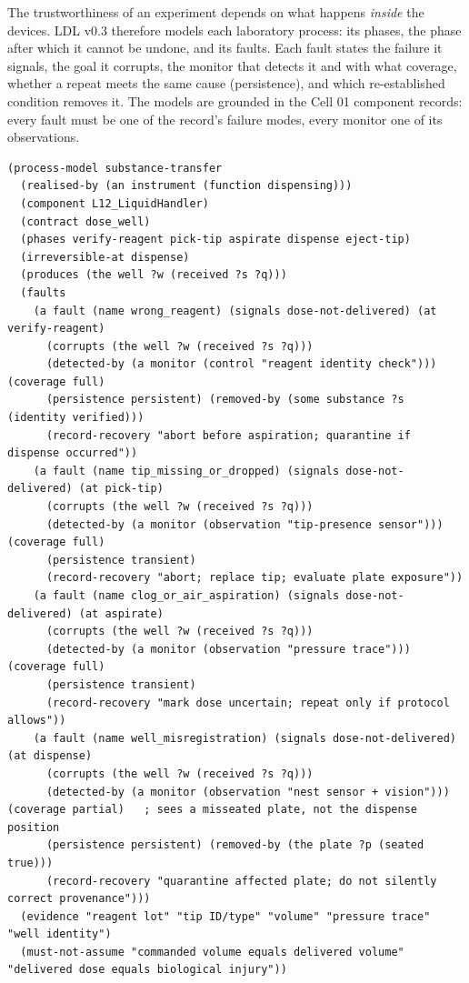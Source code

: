 \documentclass[10pt,a4paper]{article}
\begin{document}
The trustworthiness of an experiment depends on what happens \emph{inside} the devices. LDL v0.3 therefore models each laboratory process: its phases, the phase after which it cannot be undone, and its faults. Each fault states the failure it signals, the goal it corrupts, the monitor that detects it and with what coverage, whether a repeat meets the same cause (persistence), and which re-established condition removes it. The models are grounded in the Cell 01 component records: every fault must be one of the record's failure modes, every monitor one of its observations.

\begin{listing}[tbp]
\begin{Verbatim}[fontsize=\footnotesize,breaklines,frame=lines,framesep=2mm]
(process-model substance-transfer
  (realised-by (an instrument (function dispensing)))
  (component L12_LiquidHandler)
  (contract dose_well)
  (phases verify-reagent pick-tip aspirate dispense eject-tip)
  (irreversible-at dispense)
  (produces (the well ?w (received ?s ?q)))
  (faults
    (a fault (name wrong_reagent) (signals dose-not-delivered) (at verify-reagent)
      (corrupts (the well ?w (received ?s ?q)))
      (detected-by (a monitor (control "reagent identity check"))) (coverage full)
      (persistence persistent) (removed-by (some substance ?s (identity verified)))
      (record-recovery "abort before aspiration; quarantine if dispense occurred"))
    (a fault (name tip_missing_or_dropped) (signals dose-not-delivered) (at pick-tip)
      (corrupts (the well ?w (received ?s ?q)))
      (detected-by (a monitor (observation "tip-presence sensor"))) (coverage full)
      (persistence transient)
      (record-recovery "abort; replace tip; evaluate plate exposure"))
    (a fault (name clog_or_air_aspiration) (signals dose-not-delivered) (at aspirate)
      (corrupts (the well ?w (received ?s ?q)))
      (detected-by (a monitor (observation "pressure trace"))) (coverage full)
      (persistence transient)
      (record-recovery "mark dose uncertain; repeat only if protocol allows"))
    (a fault (name well_misregistration) (signals dose-not-delivered) (at dispense)
      (corrupts (the well ?w (received ?s ?q)))
      (detected-by (a monitor (observation "nest sensor + vision"))) (coverage partial)   ; sees a misseated plate, not the dispense position
      (persistence persistent) (removed-by (the plate ?p (seated true)))
      (record-recovery "quarantine affected plate; do not silently correct provenance")))
  (evidence "reagent lot" "tip ID/type" "volume" "pressure trace" "well identity")
  (must-not-assume "commanded volume equals delivered volume" "delivered dose equals biological injury"))
\end{Verbatim}
\caption{Process model of substance transfer (L12), \texttt{registry/lab/processes.ldl}.}\label{lst:process}
\end{listing}
\end{document}
